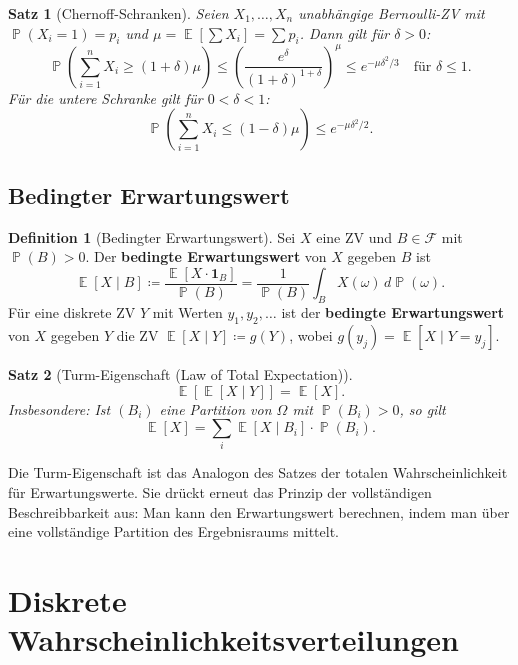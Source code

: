 ﻿\documentclass[12pt,a4paper]{article}
\theoremstyle{definition}
\newtheorem{definition}{Definition}[section]
\theoremstyle{plain}
\newtheorem{satz}{Satz}[section]
\theoremstyle{remark}
\DeclareMathOperator{\E}{\mathbb{E}}
\DeclareMathOperator{\Prob}{\mathbb{P}}
\begin{document}
\begin{satz}[Chernoff-Schranken]\label{satz:chernoff}
  Seien $X_1, \ldots, X_n$ unabhängige Bernoulli-ZV mit $\Prob(X_i=1) = p_i$
  und $\mu = \E\!\left[\sum X_i\right] = \sum p_i$. Dann gilt für $\delta > 0$:
  \[
    \Prob\!\left(\sum_{i=1}^n X_i \geq (1+\delta)\mu\right)
    \leq \left(\frac{e^\delta}{(1+\delta)^{1+\delta}}\right)^{\mu}
    \leq e^{-\mu\delta^2/3} \quad \text{für } \delta \leq 1.
  \]
  Für die untere Schranke gilt für $0 < \delta < 1$:
  \[
    \Prob\!\left(\sum_{i=1}^n X_i \leq (1-\delta)\mu\right)
    \leq e^{-\mu\delta^2/2}.
  \]
\end{satz}

\subsection{Bedingter Erwartungswert}

\begin{definition}[Bedingter Erwartungswert]\label{def:bedEW}
  Sei $X$ eine ZV und $B \in \mathcal{F}$ mit $\Prob(B) > 0$. Der
  \textbf{bedingte Erwartungswert} von $X$ gegeben $B$ ist
  \[
    \E[X \mid B] \coloneqq \frac{\E[X \cdot \mathbf{1}_B]}{\Prob(B)}
    = \frac{1}{\Prob(B)} \int_B X(\omega)\,d\Prob(\omega).
  \]
  Für eine diskrete ZV $Y$ mit Werten $y_1, y_2, \ldots$ ist der
  \textbf{bedingte Erwartungswert} von $X$ gegeben $Y$ die ZV
  $\E[X \mid Y] \coloneqq g(Y)$, wobei
  $g(y_j) = \E[X \mid Y = y_j]$.
\end{definition}

\begin{satz}[Turm-Eigenschaft (Law of Total Expectation)]\label{satz:turm}
  \[
    \E\!\left[\E[X \mid Y]\right] = \E[X].
  \]
  Insbesondere: Ist $(B_i)$ eine Partition von $\Omega$ mit $\Prob(B_i)>0$,
  so gilt
  \[
    \E[X] = \sum_i \E[X \mid B_i] \cdot \Prob(B_i).
  \]
\end{satz}

Die Turm-Eigenschaft ist das Analogon des Satzes der totalen
Wahrscheinlichkeit für Erwartungswerte. Sie drückt erneut das Prinzip der
vollständigen Beschreibbarkeit aus: Man kann den Erwartungswert berechnen,
indem man über eine vollständige Partition des Ergebnisraums mittelt.

\section{Diskrete Wahrscheinlichkeitsverteilungen}
\label{sec:verteilungen}
\end{document}
